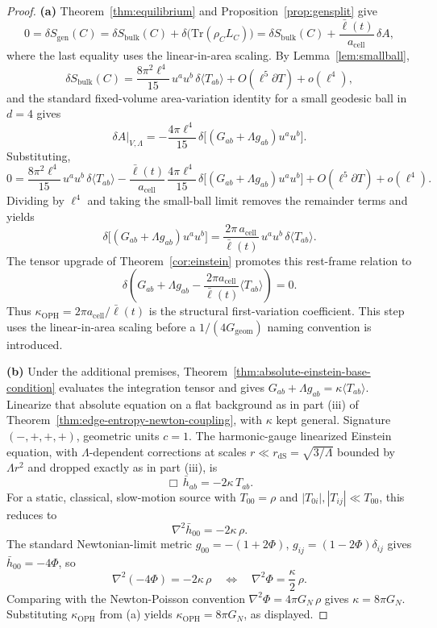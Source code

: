 \documentclass[11pt]{article}
\begin{document}
\begin{proof}
\textbf{(a)} Theorem~\ref{thm:equilibrium} and Proposition~\ref{prop:gensplit} give
\[
0=\delta S_{\mathrm{gen}}(C)=\delta S_{\mathrm{bulk}}(C)+\delta\!\bigl(\mathrm{Tr}(\rho_C L_C)\bigr)=\delta S_{\mathrm{bulk}}(C)+\frac{\bar\ell(t)}{a_{\mathrm{cell}}}\,\delta A,
\]
where the last equality uses the linear-in-area scaling. By Lemma~\ref{lem:smallball},
\[
\delta S_{\mathrm{bulk}}(C)=\frac{8\pi^2\ell^4}{15}\,u^au^b\,\delta\langle T_{ab}\rangle+O(\ell^5\partial T)+o(\ell^4),
\]
and the standard fixed-volume area-variation identity for a small geodesic ball in \(d=4\) gives
\[
\delta A\big|_{V,\Lambda}=-\frac{4\pi\ell^4}{15}\,\delta\!\bigl[(G_{ab}+\Lambda g_{ab})u^au^b\bigr].
\]
Substituting,
\[
0=\frac{8\pi^2\ell^4}{15}\,u^au^b\,\delta\langle T_{ab}\rangle-\frac{\bar\ell(t)}{a_{\mathrm{cell}}}\,\frac{4\pi\ell^4}{15}\,\delta\!\bigl[(G_{ab}+\Lambda g_{ab})u^au^b\bigr]+O(\ell^5\partial T)+o(\ell^4).
\]
Dividing by \(\ell^4\) and taking the small-ball limit removes the remainder terms and yields
\[
\delta\!\bigl[(G_{ab}+\Lambda g_{ab})u^au^b\bigr]=\frac{2\pi\,a_{\mathrm{cell}}}{\bar\ell(t)}\,u^au^b\,\delta\langle T_{ab}\rangle.
\]
The tensor upgrade of Theorem~\ref{cor:einstein} promotes this rest-frame
relation to
\[
\delta\!\left(G_{ab}+\Lambda g_{ab}
-\frac{2\pi a_{\mathrm{cell}}}{\bar\ell(t)}
\langle T_{ab}\rangle\right)=0.
\]
Thus
\(\kappa_{\mathrm{OPH}}=2\pi a_{\mathrm{cell}}/\bar\ell(t)\) is the
structural first-variation coefficient. This step uses the linear-in-area
scaling before a \(1/(4G_{\mathrm{geom}})\) naming convention is introduced.

\textbf{(b)} Under the additional premises,
Theorem~\ref{thm:absolute-einstein-base-condition} evaluates the integration
tensor and gives
\(G_{ab}+\Lambda g_{ab}=\kappa\langle T_{ab}\rangle\). Linearize that
absolute equation on a flat background as in part (iii) of
Theorem~\ref{thm:edge-entropy-newton-coupling}, with \(\kappa\) kept general.
Signature \((-,+,+,+)\), geometric units \(c=1\). The harmonic-gauge
linearized Einstein equation, with \(\Lambda\)-dependent corrections at
scales \(r\ll r_{\mathrm{dS}}=\sqrt{3/\Lambda}\) bounded by
\(\Lambda r^2\) and dropped exactly as in part (iii), is
\[
\Box\,\bar h_{ab}=-2\kappa\,T_{ab}.
\]
For a static, classical, slow-motion source with \(T_{00}=\rho\) and \(|T_{0i}|,|T_{ij}|\ll T_{00}\), this reduces to
\[
\nabla^2\bar h_{00}=-2\kappa\,\rho.
\]
The standard Newtonian-limit metric \(g_{00}=-(1+2\Phi)\), \(g_{ij}=(1-2\Phi)\delta_{ij}\) gives \(\bar h_{00}=-4\Phi\), so
\[
\nabla^2(-4\Phi)=-2\kappa\,\rho
\quad\Longleftrightarrow\quad
\nabla^2\Phi=\frac{\kappa}{2}\,\rho.
\]
Comparing with the Newton-Poisson convention \(\nabla^2\Phi=4\pi G_N\,\rho\) gives \(\kappa=8\pi G_N\). Substituting \(\kappa_{\mathrm{OPH}}\) from (a) yields \(\kappa_{\mathrm{OPH}}=8\pi G_N\), as displayed.


\end{proof}
\end{document}
